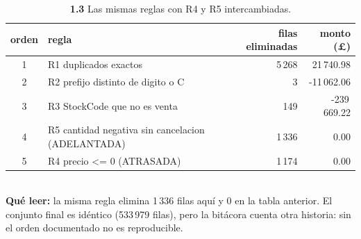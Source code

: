 \begin{table}[htbp]
\centering
\footnotesize
\caption{\textbf{1.3} Las mismas reglas con R4 y R5 intercambiadas.}
\label{tab:p1_bitacora_orden_alterno}
\begin{tabular}{clrr}
\toprule
\textbf{orden} & \textbf{regla} & \textbf{filas eliminadas} & \textbf{monto (\pounds)} \\
\midrule
1 & R1 duplicados exactos & 5\,268 & 21\,740.98 \\
2 & R2 prefijo distinto de digito o C & 3 & -11\,062.06 \\
3 & R3 StockCode que no es venta & 149 & -239\,669.22 \\
4 & R5 cantidad negativa sin cancelacion (ADELANTADA) & 1\,336 & 0.00 \\
5 & R4 precio <= 0 (ATRASADA) & 1\,174 & 0.00 \\
\bottomrule
\end{tabular}
\\[0.3em]{\scriptsize \textbf{Qu\'e leer:} la misma regla elimina 1\,336 filas aqu\'i y 0 en la tabla anterior. El conjunto final es id\'entico (533\,979 filas), pero la bit\'acora cuenta otra historia: sin el orden documentado no es reproducible.}
\end{table}
